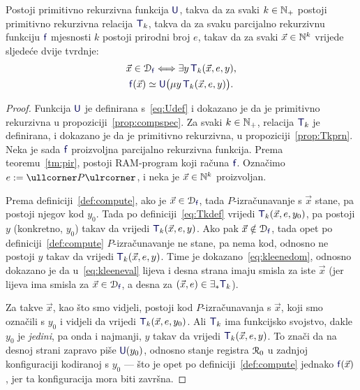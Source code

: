 \begin{teorem}\label{tm:Kleene}
Postoji primitivno rekurzivna funkcija $\f U$, takva da za svaki $k\in{\mathbb N}_+$ postoji primitivno rekurzivna relacija $\f T_k$, takva da za svaku parcijalno rekurzivnu funkciju $\f f$ mjesnosti $k$ postoji prirodni broj $e$, takav da za svaki $\vec x\in{\mathbb N}^k$ vrijede sljedeće dvije tvrdnje:
\begin{gather}
    \label{eq:kleenedom}\vec x\in\dom{\f f}\Longleftrightarrow\exists y\,\f T_k(\vec x,e,y)\text,\\
    \label{eq:kleeneval}\f f(\vec x)\simeq\f U\bigl(\mu y\,\f T_k(\vec x,e,y)\bigr)\text.
\end{gather}
\end{teorem}
\begin{proof}
Funkcija $\f U$ je definirana s~\eqref{eq:Udef} i dokazano je da je primitivno rekurzivna u propoziciji~\ref{prop:compspec}. Za svaki $k\in{\mathbb N}_+$, relacija $\f T_k$ je definirana, i dokazano je da je primitivno rekurzivna, u propoziciji~\ref{prop:Tkprn}. Neka je sada $\f f$ proizvoljna parcijalno rekurzivna funkcija. Prema teoremu~\ref{tm:pir}, postoji RAM-program koji računa $\f f$. Označimo $e:=\kprog P$, i neka je $\vec x\in{\mathbb N}^k$ proizvoljan.

Prema definiciji~\ref{def:compute}, ako je $\vec x\in\dom{\f f}$, tada $P$-izračunavanje s $\vec x$ stane, pa postoji njegov kod $y_0$. Tada po definiciji~\eqref{eq:Tkdef} vrijedi $\f T_k(\vec x,e,y_0)$, pa postoji $y$ (konkretno, $y_0$) takav da vrijedi $\f T_k(\vec x,e,y)$. Ako pak $\vec x\notin\dom{\f f}$, tada opet po definiciji~\ref{def:compute} $P$-izračunavanje ne stane, pa nema kod, odnosno ne postoji $y$ takav da vrijedi $\f T_k(\vec x,e,y)$. Time je dokazano~\eqref{eq:kleenedom}, odnosno dokazano je da u~\eqref{eq:kleeneval} lijeva i desna strana imaju smisla za iste $\vec x$ (jer lijeva ima smisla za $\vec x\in\dom{\f f}$, a desna za $(\vec x,e)\in\exists_*\f T_k$).

Za takve $\vec x$, kao što smo vidjeli, postoji kod $P$-izračunavanja s $\vec x$, koji smo označili s $y_0$ i vidjeli da vrijedi $\f T_k(\vec x,e,y_0)$. Ali $\f T_k$ ima funkcijsko svojstvo, dakle $y_0$ je \emph{jedini}, pa onda i najmanji, $y$ takav da vrijedi $\f T_k(\vec x,e,y)$. To znači da na desnoj strani zapravo piše $\f U(y_0)$, odnosno stanje registra $\mathcal R_{0}$ u zadnjoj konfiguraciji kodiranoj s $y_0$ --- što je opet po definiciji~\ref{def:compute} jednako $\f f(\vec x)$, jer ta konfiguracija mora biti završna.
\end{proof}

